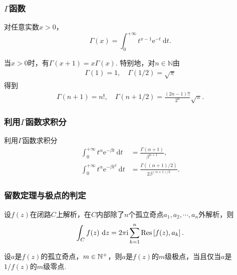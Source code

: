 \begin{frame}
    \frametitle{$\Gamma$函数}

    \begin{mydefinition}[$\Gamma$函数]
        对任意实数$x>0$，
        \begin{equation}
            \Gamma(x)=\int_0^{+\infty}t^{x-1}\mathrm e^{-t}\ \mathrm dt.
        \end{equation}
    \end{mydefinition}

    \begin{myproposition}
        当$x>0$时，有$\Gamma(x+1)=x\Gamma(x)$. 特别地，对$n\in\mathbb{N}$由
        \begin{align*}
            \Gamma(1)=1,\quad
            \Gamma(1/2)=\sqrt\pi
        \end{align*}
        得到
        \begin{align}
            \Gamma(n+1)=n!,\quad
            \Gamma(n+1/2)=\frac{(2n-1)!!}{2^n}\sqrt\pi.
        \end{align}
    \end{myproposition}
\end{frame}

\begin{frame}
    \frametitle{利用$\Gamma$函数求积分}
    \begin{exampleblock}{利用$\Gamma$函数求积分}
        \begin{align}
            \int_0^{+\infty}t^\alpha \mathrm e^{-\beta t}\ \mathrm dt&=\frac{\Gamma(\alpha+1)}{\beta^{\alpha+1}},\\
            \int_0^{+\infty}t^\alpha \mathrm e^{-\beta t^2}\ \mathrm dt&=\frac{\Gamma((\alpha+1)/2)}{2\beta^{(\alpha+1)/2}}.
        \end{align}
    \end{exampleblock}
\end{frame}

\begin{frame}
    \frametitle{留数定理与极点的判定}
    \begin{mytheorem}[留数定理]
        设$f(z)$在闭路$C$上解析，在$C$内部除了$n$个孤立奇点$a_1,a_2,\cdots,a_n$外解析，则
        \begin{equation}
            \int_Cf(z)\ \mathrm dz=2\pi\mathrm i\sum_{k=1}^n\mathrm{Res}\left[f(z), a_k\right].
        \end{equation}
    \end{mytheorem}
    \begin{mytheorem}[极点的判定]
        设$a$是$f(z)$的孤立奇点，$m\in\mathbb{N}^+$，则$a$是$f(z)$的$m$级极点，当且仅当$a$是$1/f(z)$的$m$级零点. 
    \end{mytheorem}
\end{frame}

